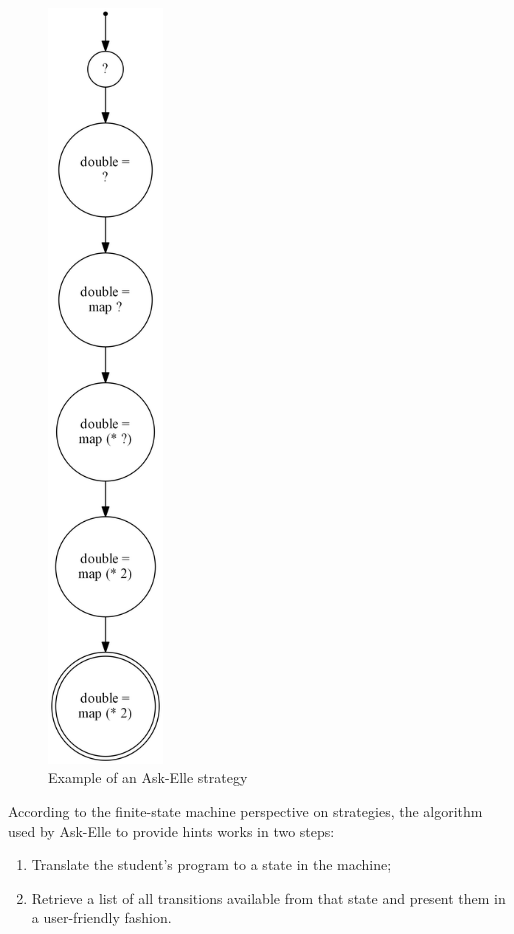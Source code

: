 \begin{figure}
\centering
\includegraphics[height=20cm]{graphs/bg-fsm-prog-strategies}
\caption{Example of an Ask-Elle strategy}
\label{fig:bg-fsm-prog-strategies}
\end{figure}

According to the finite-state machine perspective on strategies, the algorithm used by Ask-Elle to provide hints works in two steps:

\begin{enumerate}
    \item Translate the student's program to a state in the machine;
    \item Retrieve a list of all transitions available from that state and present them in a user-friendly fashion.
\end{enumerate}


